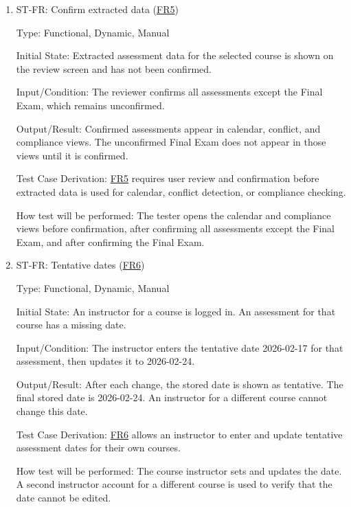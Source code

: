 \documentclass[12pt, titlepage]{article}
\newcounter{stnum}
\newcommand{\frlink}[1]{\href{https://github.com/shivyam/cas-course-optimization/blob/main/pdfs/SRS-IEEE/SRS.pdf}{FR#1}}
\begin{document}
\begin{enumerate}
Test Case Derivation: \frlink{4} requires flagging of any extracted field that is missing, including a date marked TBD.

How test will be performed: The tester inspects the extraction review screen and compares the missing-field flags to the handwritten answer key.


\item{ST-FR\thestnum \label{ST_Extract_Review}: Confirm extracted data (\frlink{5})\\}

Type: Functional, Dynamic, Manual

Initial State: Extracted assessment data for the selected course is shown on the review screen and has not been confirmed.

Input/Condition: The reviewer confirms all assessments except the Final Exam, which remains unconfirmed.

Output/Result: Confirmed assessments appear in calendar, conflict, and compliance views. The unconfirmed Final Exam does not appear in those views until it is confirmed.

Test Case Derivation: \frlink{5} requires user review and confirmation before extracted data is used for calendar, conflict detection, or compliance checking.

How test will be performed: The tester opens the calendar and compliance views before confirmation, after confirming all assessments except the Final Exam, and after confirming the Final Exam.


\item{ST-FR\thestnum \label{ST_Dates_Tentative}: Tentative dates (\frlink{6})\\}

Type: Functional, Dynamic, Manual

Initial State: An instructor for a course is logged in. An assessment for that course has a missing date.

Input/Condition: The instructor enters the tentative date 2026-02-17 for that assessment, then updates it to 2026-02-24.

Output/Result: After each change, the stored date is shown as tentative. The final stored date is 2026-02-24. An instructor for a different course cannot change this date.

Test Case Derivation: \frlink{6} allows an instructor to enter and update tentative assessment dates for their own courses.

How test will be performed: The course instructor sets and updates the date. A second instructor account for a different course is used to verify that the date cannot be edited.

\end{enumerate}
\end{document}
